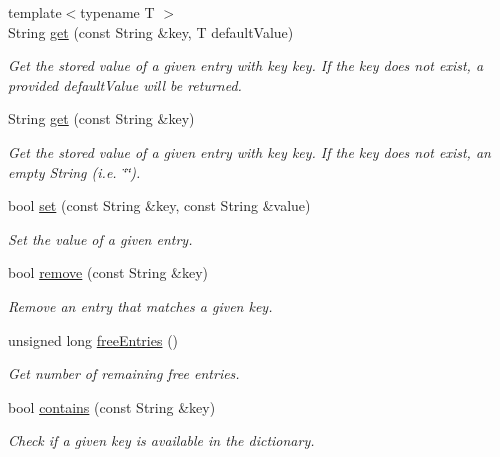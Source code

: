 \begin{DoxyCompactItemize}
{\footnotesize template$<$typename T $>$ }\\String \mbox{\hyperlink{class_nv_mem_flash_dict_a49632ee590fb5cf5b27bd6442c016e6f}{get}} (const String \&key, T default\+Value)
\begin{DoxyCompactList}\small\item\em Get the stored value of a given entry with key {\ttfamily key}. If the {\ttfamily key} does not exist, a provided {\ttfamily default\+Value} will be returned. \end{DoxyCompactList}\item 
String \mbox{\hyperlink{class_nv_mem_flash_dict_a16eb803b23dc954a814ac2dc8580bd5e}{get}} (const String \&key)
\begin{DoxyCompactList}\small\item\em Get the stored value of a given entry with key {\ttfamily key}. If the {\ttfamily key} does not exist, an empty {\ttfamily String} (i.\+e. {\ttfamily \char`\"{}\char`\"{}}). \end{DoxyCompactList}\item 
bool \mbox{\hyperlink{class_nv_mem_flash_dict_ad88e325c0a9cebef246815c6bcdc9cef}{set}} (const String \&key, const String \&value)
\begin{DoxyCompactList}\small\item\em Set the value of a given entry. \end{DoxyCompactList}\item 
bool \mbox{\hyperlink{class_nv_mem_flash_dict_a1afddb8d0ae4cc6be96f83434763c26d}{remove}} (const String \&key)
\begin{DoxyCompactList}\small\item\em Remove an entry that matches a given {\ttfamily key}. \end{DoxyCompactList}\item 
unsigned long \mbox{\hyperlink{class_nv_mem_flash_dict_a1db17ef21b447a6e644389cc5b44f122}{free\+Entries}} ()
\begin{DoxyCompactList}\small\item\em Get number of remaining free entries. \end{DoxyCompactList}\item 
bool \mbox{\hyperlink{class_nv_mem_flash_dict_aab2e9f6da1d6ba89df32c20b1746ea75}{contains}} (const String \&key)
\begin{DoxyCompactList}\small\item\em Check if a given {\ttfamily key} is available in the dictionary. \end{DoxyCompactList}\end{DoxyCompactItemize}
